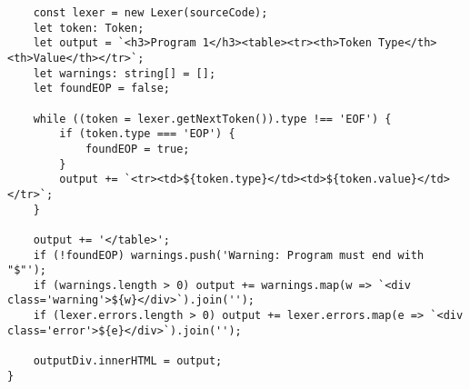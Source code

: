 \documentclass[12pt]{article}
\begin{document}
\begin{lstlisting}
    const lexer = new Lexer(sourceCode);
    let token: Token;
    let output = `<h3>Program 1</h3><table><tr><th>Token Type</th><th>Value</th></tr>`;
    let warnings: string[] = [];
    let foundEOP = false;
    
    while ((token = lexer.getNextToken()).type !== 'EOF') {
        if (token.type === 'EOP') {
            foundEOP = true;
        }
        output += `<tr><td>${token.type}</td><td>${token.value}</td></tr>`;
    }
    
    output += '</table>';
    if (!foundEOP) warnings.push('Warning: Program must end with "$"');
    if (warnings.length > 0) output += warnings.map(w => `<div class='warning'>${w}</div>`).join('');
    if (lexer.errors.length > 0) output += lexer.errors.map(e => `<div class='error'>${e}</div>`).join('');
    
    outputDiv.innerHTML = output;
}

\end{lstlisting}
\end{document}
